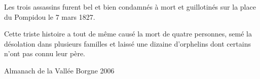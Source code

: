 Les trois assassins furent bel et bien condamnés à mort et guillotinés sur la place du
Pompidou le 7 mars 1827.

Cette triste histoire a tout de même causé la mort de quatre personnes, semé la désolation dans
plusieurs familles et laissé une dizaine d’orphelins dont certains n’ont pas connu leur père.

\begin{flushright}
Almanach de la Vallée Borgne 2006
\end{flushright}
